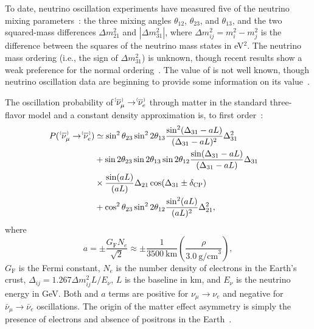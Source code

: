 To date, neutrino oscillation experiments have measured five of the neutrino mixing parameters~\cite{Esteban:2018azc,deSalas:2017kay,Capozzi:2017yic}: the three mixing angles $\theta_{12}$, $\theta_{23}$, and $\theta_{13}$, and the two squared-mass differences $\Delta m^{2}_{21}$ and $|\Delta m^{2}_{31}|$, where $\Delta m^2_{ij} = m^2_{i} - m^{2}_{j}$ is the difference between the squares of the neutrino mass states in eV$^{2}$.
The neutrino mass ordering (i.e., the sign of $\Delta m^{2}_{31}$) is unknown, though recent results show a weak preference for the normal ordering~\cite{Abe:2021gky,PhysRevD.97.072001,PhysRevLett.123.151803}.
The value of \deltacp is not well known, though neutrino oscillation data are beginning to provide some information on its value~\cite{Abe:2019vii,Abe:2021gky}.

The oscillation probability of $\nu^{\bracketbar}_\mu \rightarrow \nu^{\bracketbar}_e$ through matter in the standard three-flavor model and a constant density approximation is, to first order~\cite{Nunokawa:2007qh}:
\begin{equation}
  \begin{aligned}
    P(\;\nu^{\bracketbar}_\mu \rightarrow \nu^{\bracketbar}_e) & \simeq \sin^2 \theta_{23} \sin^2 2 \theta_{13} 
    \frac{ \sin^2(\Delta_{31} - aL)}{(\Delta_{31}-aL)^2} \Delta_{31}^2 \\
    & + \sin 2 \theta_{23} \sin 2 \theta_{13} \sin 2 \theta_{12}\frac{ \sin(\Delta_{31} - aL)}{(\Delta_{31}-aL)} \Delta_{31} \\
    &\times \frac{\sin(aL)}{(aL)} \Delta_{21} \cos (\Delta_{31} \pm \deltacp) & \\
    & + \cos^2 \theta_{23} \sin^2 2 \theta_{12} \frac {\sin^2(aL)}{(aL)^2} \Delta_{21}^2,
  \end{aligned}
  \label{eqn:appprob}
\end{equation}
where
\begin{equation*}
  a = \pm \frac{G_{\mathrm{F}}N_e}{\sqrt{2}} \approx \pm\frac{1}{3500~\mathrm{km}}\left(\frac{\rho}{3.0~\mathrm{g/cm}^{3}}\right),
\end{equation*}
$G_{\mathrm{F}}$ is the Fermi constant, $N_e$ is the number density of electrons in the Earth's crust, $\Delta_{ij} = 1.267 \Delta m^2_{ij} L/E_\nu$, $L$ is the baseline in km, and $E_\nu$ is the neutrino energy in GeV. 
Both \deltacp and $a$ terms are positive for $\nu_\mu \to \nu_e$ and negative for $\bar{\nu}_\mu \to \bar{\nu}_e$ oscillations. The origin of the matter effect asymmetry 
is simply the presence of electrons and absence of positrons in the Earth~\cite{Wolfenstein:1977ue,Mikheev:1986gs}.

